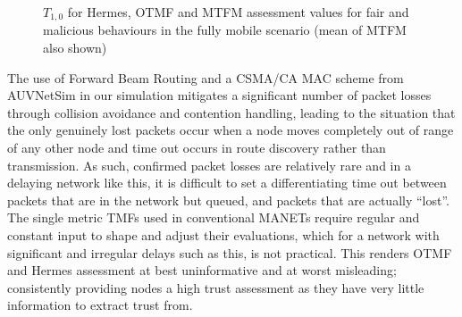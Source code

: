\documentclass[conference]{IEEEtran}
\begin{document}
\begin{figure}[t]
\caption{$T_{1,0}$ for Hermes, OTMF and MTFM assessment values for fair and malicious behaviours in the fully mobile scenario (mean of MTFM also shown)}
\label{fig:otmf_beta_comparison}
\end{figure}
%
The use of Forward Beam Routing and a CSMA/CA MAC scheme from AUVNetSim \cite{Miquel2008} in our simulation mitigates a significant number of packet losses through collision avoidance and contention handling, leading to the situation that the only genuinely lost packets occur when a node moves completely out of range of any other node and time out occurs in route discovery rather than transmission.
As such, confirmed packet losses are relatively rare and in a delaying network like this, it is difficult to set a differentiating time out between packets that are in the network but queued, and packets that are actually ``lost''.
The single metric TMFs used in conventional MANETs require regular and constant input to shape and adjust their evaluations, which for a network with significant and irregular delays such as this, is not practical.
This renders OTMF and Hermes assessment at best uninformative and at worst misleading; consistently providing nodes a high trust assessment as they have very little information to extract trust from. 
\end{document}

